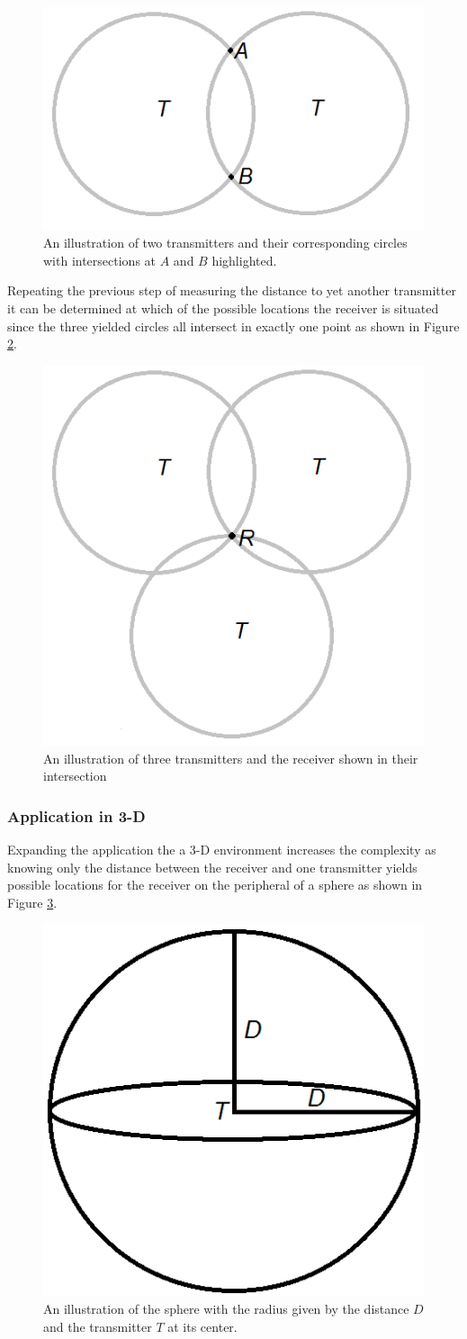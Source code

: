 \begin{figure}[H] 
  \centering
      \includegraphics[height=0.25\textwidth]{img/2Circles}
  \caption{An illustration of two transmitters and their corresponding circles with intersections at $A$ and $B$ highlighted.}
  \label{fig_2circles}
\end{figure}

Repeating the previous step of measuring the distance to yet another transmitter it can be determined at which of the possible locations the receiver is situated since the three yielded circles all intersect in exactly one point as shown in Figure \ref{fig_3circles}.

\begin{figure}[H] 
  \centering
      \includegraphics[height=0.45\textwidth]{img/3Circles}
  \caption{An illustration of three transmitters and the receiver shown in their intersection}
  \label{fig_3circles}
\end{figure}

\subsubsection{Application in 3-D}
Expanding the application the a 3-D environment increases the complexity as knowing only the distance between the receiver and one transmitter yields possible locations for the receiver on the peripheral of a sphere as shown in Figure \ref{fig_sphere}.
\begin{figure}[H] 
  \centering
      \includegraphics[height=0.25\textwidth]{img/Sphere}
  \caption{An illustration of the sphere with the radius given by the distance $D$ and the transmitter $T$ at its center.}
  \label{fig_sphere}
\end{figure}


